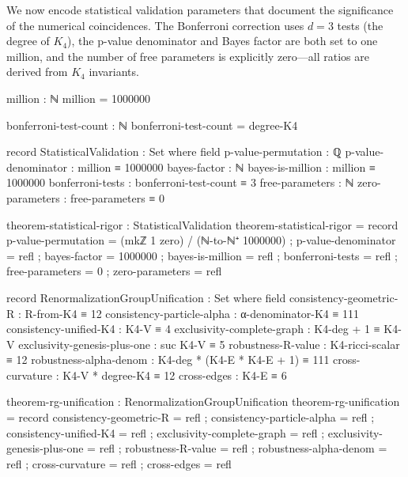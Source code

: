 \documentclass[11pt,a4paper]{book}
\begin{document}
We now encode statistical validation parameters that document the significance of the
numerical coincidences. The Bonferroni correction uses $d = 3$ tests (the degree of $K_4$),
the p-value denominator and Bayes factor are both set to one million, and the number of
free parameters is explicitly zero---all ratios are derived from $K_4$ invariants.

\begin{code}
million : ℕ
million = 1000000

bonferroni-test-count : ℕ
bonferroni-test-count = degree-K4

record StatisticalValidation : Set where
  field
    p-value-permutation : ℚ
    p-value-denominator : million ≡ 1000000
    bayes-factor : ℕ
    bayes-is-million : million ≡ 1000000
    bonferroni-tests : bonferroni-test-count ≡ 3
    free-parameters : ℕ
    zero-parameters : free-parameters ≡ 0

theorem-statistical-rigor : StatisticalValidation
theorem-statistical-rigor = record
  { p-value-permutation = (mkℤ 1 zero) / (ℕ-to-ℕ⁺ 1000000)
  ; p-value-denominator = refl
  ; bayes-factor = 1000000
  ; bayes-is-million = refl
  ; bonferroni-tests = refl
  ; free-parameters = 0
  ; zero-parameters = refl
  }
\end{code}

\begin{code}
record RenormalizationGroupUnification : Set where
  field
    consistency-geometric-R : R-from-K4 ≡ 12
    consistency-particle-alpha : α-denominator-K4 ≡ 111
    consistency-unified-K4 : K4-V ≡ 4
    exclusivity-complete-graph : K4-deg + 1 ≡ K4-V
    exclusivity-genesis-plus-one : suc K4-V ≡ 5
    robustness-R-value : K4-ricci-scalar ≡ 12
    robustness-alpha-denom : K4-deg * (K4-E * K4-E + 1) ≡ 111
    cross-curvature : K4-V * degree-K4 ≡ 12
    cross-edges : K4-E ≡ 6

theorem-rg-unification : RenormalizationGroupUnification
theorem-rg-unification = record
  { consistency-geometric-R = refl
  ; consistency-particle-alpha = refl
  ; consistency-unified-K4 = refl
  ; exclusivity-complete-graph = refl
  ; exclusivity-genesis-plus-one = refl
  ; robustness-R-value = refl
  ; robustness-alpha-denom = refl
  ; cross-curvature = refl
  ; cross-edges = refl
  }
\end{code}
\end{document}

